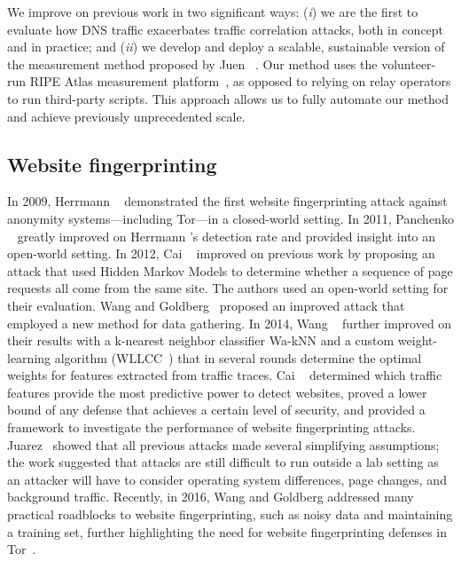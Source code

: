 We improve on previous work in two significant ways: (\emph{i}) we are
the first to evaluate how DNS traffic exacerbates traffic correlation
attacks, both in concept and in practice; and (\emph{ii}) we develop and
deploy a scalable, sustainable version of the measurement method proposed by Juen
\ea~\cite{Juen2015a}.  Our method uses the volunteer-run RIPE Atlas
measurement platform~\cite{atlas}, as opposed to relying on relay operators
to run third-party scripts.  This approach allows us to fully automate
our method and achieve previously unprecedented scale.

\subsection{Website fingerprinting}
In 2009, Herrmann \ea~\cite{Herrmann2009a} demonstrated the first website
fingerprinting attack against anonymity systems---including Tor---in a
closed-world setting.  In 2011, Panchenko \ea~\cite{Panchenko2011a} greatly
improved on Herrmann \ea's detection rate and provided insight into an open-world
setting.  In 2012, Cai \ea~\cite{Cai2012a} improved on previous work by
proposing an attack that used Hidden Markov Models to determine whether a sequence of
page requests all come from the same site.  The authors used an open-world
setting for their evaluation.  Wang and Goldberg~\cite{Wang2013a} proposed an
improved attack that employed a new method for data gathering.  In 2014, Wang
\ea~\cite{Wang2014a} further improved on their results with a
k-nearest neighbor classifier Wa-kNN and a custom weight-learning algorithm
(WLLCC~\cite{Wang2015a}) that in several rounds determine the optimal weights
for features extracted from traffic traces.
Cai \ea~\cite{Cai2014b}
determined which traffic features provide the most predictive power to detect
websites, proved a lower bound of any defense that achieves a certain level of
security, and provided a framework to investigate the performance of
website fingerprinting attacks.
Juarez~\cite{Juarez2014a} showed that all previous attacks
made several simplifying
assumptions; the work suggested that attacks are still
difficult to run outside a lab setting as an attacker will have to consider
operating system differences, page changes, and background traffic.
Recently, in 2016, Wang and Goldberg addressed many practical
roadblocks to website fingerprinting, such as noisy data and maintaining a training set,
further highlighting the need for website fingerprinting defenses in
Tor~\cite{Wang2016a}.

